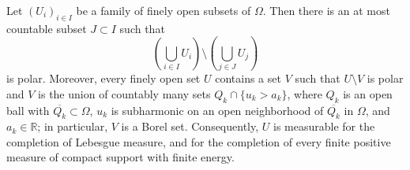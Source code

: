 \begin{theorem}\label{thm:fine-quasi-lindelof}
Let $(U_i)_{i\in I}$ be a family of finely open subsets of $\Omega$. Then there is an at most countable subset $J\subset I$ such that
\[
 \left(\bigcup_{i\in I}U_i\right)\setminus\left(\bigcup_{j\in J}U_j\right)
\]
is polar. Moreover, every finely open set $U$ contains a set $V$ such that $U\setminus V$ is polar and $V$ is the union of countably many sets $Q_k\cap\{u_k>a_k\}$, where $Q_k$ is an open ball with $\overline{Q_k}\subset\Omega$, $u_k$ is subharmonic on an open neighborhood of $\overline{Q_k}$ in $\Omega$, and $a_k\in\mathbb R$; in particular, $V$ is a Borel set. Consequently, $U$ is measurable for the completion of Lebesgue measure, and for the completion of every finite positive measure of compact support with finite energy.
\end{theorem}
